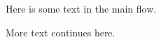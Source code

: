 \documentclass{article}
\begin{document}
Here is some text in the main flow.


\begin{marginfigure}
  \scalebox{0.4}{}
  \caption{A margin figure with its own caption}
  \label{fig:side}
\end{marginfigure}

More text continues here.
\end{document}
